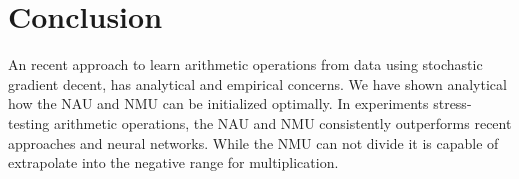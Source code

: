 \section{Conclusion}

An recent approach to learn arithmetic operations from data using stochastic gradient decent, has analytical and empirical concerns.
We have shown analytical how the NAU and NMU can be initialized optimally. In experiments stress-testing arithmetic operations, the NAU and NMU consistently outperforms recent approaches and neural networks.
While the NMU can not divide it is capable of extrapolate into the negative range for multiplication.


